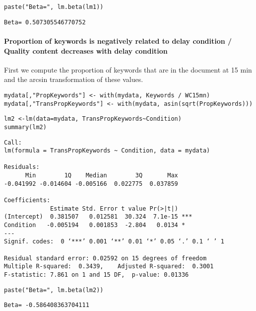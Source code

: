 \documentclass[10pt]{article}
\begin{document}
\begin{verbatim}
paste("Beta=", lm.beta(lm1))
\end{verbatim}

\begin{verbatim}
Beta= 0.507305546770752
\end{verbatim}

\paragraph*{Proportion of keywords is negatively related to delay condition / Quality content decreases with delay condition}
\label{sec-2-2-1-2}

First we compute the proportion of keywords that are in the document
at 15 min and the arcsin transformation of these values.

\begin{verbatim}
mydata[,"PropKeywords"] <- with(mydata, Keywords / WC15mn)
mydata[,"TransPropKeywords"] <- with(mydata, asin(sqrt(PropKeywords)))
\end{verbatim}

\begin{verbatim}
lm2 <-lm(data=mydata, TransPropKeywords~Condition)
summary(lm2)
\end{verbatim}

\begin{verbatim}
Call:
lm(formula = TransPropKeywords ~ Condition, data = mydata)

Residuals:
      Min        1Q    Median        3Q       Max 
-0.041992 -0.014604 -0.005166  0.022775  0.037859 

Coefficients:
             Estimate Std. Error t value Pr(>|t|)    
(Intercept)  0.381507   0.012581  30.324  7.1e-15 ***
Condition   -0.005194   0.001853  -2.804   0.0134 *  
---
Signif. codes:  0 ‘***’ 0.001 ‘**’ 0.01 ‘*’ 0.05 ‘.’ 0.1 ‘ ’ 1

Residual standard error: 0.02592 on 15 degrees of freedom
Multiple R-squared:  0.3439,	Adjusted R-squared:  0.3001 
F-statistic: 7.861 on 1 and 15 DF,  p-value: 0.01336
\end{verbatim}

\begin{verbatim}
paste("Beta=", lm.beta(lm2))
\end{verbatim}

\begin{verbatim}
Beta= -0.586408363704111
\end{verbatim}
\end{document}
